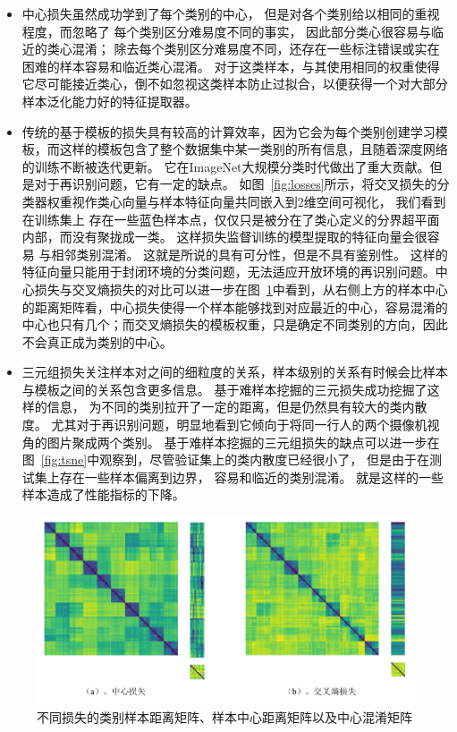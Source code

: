 \begin{itemize}
	\item 中心损失虽然成功学到了每个类别的中心，
	      但是对各个类别给以相同的重视程度，而忽略了
	      每个类别区分难易度不同的事实，
	      因此部分类心很容易与临近的类心混淆；
	      除去每个类别区分难易度不同，还存在一些标注错误或实在困难的样本容易和临近类心混淆。
	      对于这类样本，与其使用相同的权重使得它尽可能接近类心，倒不如忽视这类样本防止过拟合，以便获得一个对大部分样本泛化能力好的特征提取器。
	\item 传统的基于模板的损失具有较高的计算效率，因为它会为每个类别创建学习模板，而这样的模板包含了整个数据集中某一类别的所有信息，且随着深度网络的训练不断被迭代更新。
	      它在ImageNet大规模分类时代做出了重大贡献。但是对于再识别问题，它有一定的缺点。
	      如图~\ref{fig:losses}所示，将交叉损失的分类器权重视作类心向量与样本特征向量共同嵌入到2维空间可视化，
	      我们看到在训练集上
	      存在一些蓝色样本点，仅仅只是被分在了类心定义的分界超平面内部，而没有聚拢成一类。
	      这样损失监督训练的模型提取的特征向量会很容易
	      与相邻类别混淆。
	      这就是所说的具有可分性，但是不具有鉴别性。
	      这样的特征向量只能用于封闭环境的分类问题，无法适应开放环境的再识别问题。中心损失与交叉熵损失的对比可以进一步在图~\ref{fig:distmat-all}中看到，从右侧上方的样本中心的距离矩阵看，中心损失使得一个样本能够找到对应最近的中心，容易混淆的中心也只有几个；而交叉熵损失的模板权重，只是确定不同类别的方向，因此不会真正成为类别的中心。
	\item 三元组损失关注样本对之间的细粒度的关系，样本级别的关系有时候会比样本与模板之间的关系包含更多信息。
	      基于难样本挖掘的三元损失成功挖掘了这样的信息，
	      为不同的类别拉开了一定的距离，但是仍然具有较大的类内散度。
	      尤其对于再识别问题，明显地看到它倾向于将同一行人的两个摄像机视角的图片聚成两个类别。 
	      基于难样本挖掘的三元组损失的缺点可以进一步在图~\ref{fig:tsne}中观察到，尽管验证集上的类内散度已经很小了，
	      但是由于在测试集上存在一些样本偏离到边界，
	      容易和临近的类别混淆。
	      就是这样的一些样本造成了性能指标的下降。
\end{itemize}

\begin{figure}
	\centering 
	\includegraphics[width=\textwidth]{fig/2018-05-20-14-43-35.png}
	\caption{不同损失的类别样本距离矩阵、样本中心距离矩阵以及中心混淆矩阵} \label{fig:distmat-all}
\end{figure}

